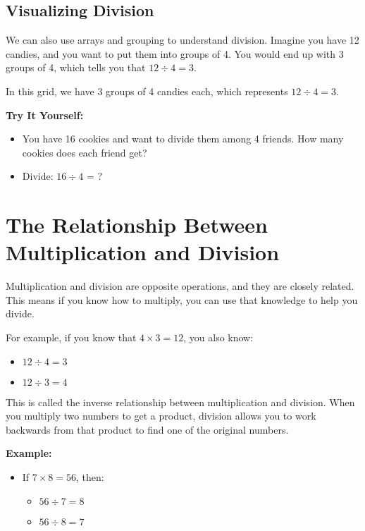 \subsection{Visualizing Division}
We can also use arrays and grouping to understand division. Imagine you have 12 candies, and you want to put them into groups of 4. You would end up with 3 groups of 4, which tells you that $12 \div 4 = 3$.
\begin{center}
\end{center}

In this grid, we have 3 groups of 4 candies each, which represents $12 \div 4 = 3$.

\textbf{Try It Yourself:}
\begin{itemize}
    \item You have 16 cookies and want to divide them among 4 friends. How many cookies does each friend get?
    \item Divide: $16 \div 4$ = ?
\end{itemize}

\section{The Relationship Between Multiplication and Division}
Multiplication and division are opposite operations, and they are closely related. This means if you know how to multiply, you can use that knowledge to help you divide.

For example, if you know that $4 \times 3 = 12$, you also know:
\begin{itemize}
    \item $12 \div 4 = 3$
    \item $12 \div 3 = 4$
\end{itemize}

This is called the inverse relationship between multiplication and division. When you multiply two numbers to get a product, division allows you to work backwards from that product to find one of the original numbers.

\textbf{Example:}
\begin{itemize}
    \item If $7 \times 8 = 56$, then:
    \begin{itemize}
        \item $56 \div 7 = 8$
        \item $56 \div 8 = 7$
    \end{itemize}
\end{itemize}

